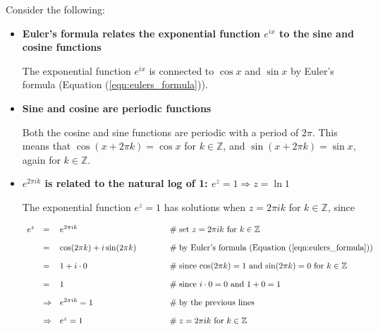 \documentclass{article}
\theoremstyle{definition}
\begin{document}
\medskip
Consider the following:

\begin{itemize}
\item {\bf Euler's formula relates the exponential function $e^{ix}$ 
to the sine and cosine functions}

\medskip
The exponential function $e^{ix}$ is connected to $\cos x$ and
$\sin x$ by Euler's formula (Equation (\ref{eqn:eulers_formula})).


\item {\bf Sine and cosine are periodic functions}

\medskip
Both the cosine and sine functions are periodic with a period of 
$2\pi$. This means that $\cos(x+2\pi k) = \cos x$ for $k \in \mathbb{Z}$, 
and $\sin(x+2\pi k) = \sin x$, again for $k \in \mathbb{Z}$.

\item {\bf $e^{2\pi ik}$ is related to the natural log of 1: $e^z = 1 \Rightarrow z = \ln 1$}

\medskip
The exponential function $e^z = 1$ has solutions when
$z = 2\pi i k$ for $k \in \mathbb{Z}$, since 

\smallskip
\begin{equation*}
\begin{array}{lllll}
e^z
&=& e^{2\pi ik} 
		&\hspace{3em} \mathrel{\#} \text{set $z = 2\pi i k$ for $k \in \mathbb{Z}$} \\
[10pt]
&=& \cos(2\pi k) + i\sin(2\pi k) 
		&\hspace{3em} \mathrel{\#} \text{by Euler's formula (Equation (\ref{eqn:eulers_formula}))} \\
[10pt]
&=& 1 + i \cdot 0
		&\hspace{3em} \mathrel{\#} \text{since $\cos(2\pi k) = 1$ and $\sin(2\pi k) = 0$ for $k \in \mathbb{Z}$} \\
[10pt]
&=& 1 
		&\hspace{3em} \mathrel{\#} \text{since $i \cdot 0 = 0$ and $1+0 = 1$} \\
[10pt]
&\Rightarrow& e^{2\pi ik} = 1 
		&\hspace{3em} \mathrel{\#} \text{by the previous lines} \\
[10pt]
&\Rightarrow& e^{z} = 1 
		&\hspace{3em} \mathrel{\#} \text{$z = 2\pi i k$ for $k \in \mathbb{Z}$}

\end{array}
\end{equation*}
\end{itemize}
\end{document}
